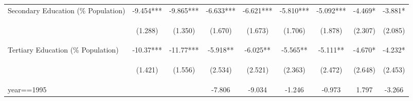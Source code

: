 \begin{landscape}
\begin{table}[htpb!]
\begin{center}
\begin{tabular}{lcccccccc}
Secondary Education (\% Population)	&	-9.454***	&	-9.865***	&	-6.633***	&	-6.621***	&	-5.810***	&	-5.092***	&	-4.469*	&	-3.881*	\\	
	& \begin{footnotesize}	(1.288)	\end{footnotesize} & \begin{footnotesize}	(1.350)	\end{footnotesize} & \begin{footnotesize}	(1.670)	\end{footnotesize} & \begin{footnotesize}	(1.673)	\end{footnotesize} & \begin{footnotesize}	(1.706)	\end{footnotesize} & \begin{footnotesize}	(1.878)	\end{footnotesize} & \begin{footnotesize}	(2.307)	\end{footnotesize} & \begin{footnotesize}	(2.085)	\end{footnotesize} \\	
Tertiary Education (\% Population)	&	-10.37***	&	-11.77***	&	-5.918**	&	-6.025**	&	-5.565**	&	-5.111**	&	-4.670*	&	-4.232*	\\	
	& \begin{footnotesize}	(1.421)	\end{footnotesize} & \begin{footnotesize}	(1.556)	\end{footnotesize} & \begin{footnotesize}	(2.534)	\end{footnotesize} & \begin{footnotesize}	(2.521)	\end{footnotesize} & \begin{footnotesize}	(2.363)	\end{footnotesize} & \begin{footnotesize}	(2.472)	\end{footnotesize} & \begin{footnotesize}	(2.648)	\end{footnotesize} & \begin{footnotesize}	(2.453)	\end{footnotesize} \\	
year==1995	&		&		&	-7.806	&	-9.034	&	-1.246	&	-0.973	&	1.797	&	-3.266	\\	

\end{tabular}
\end{center}
\end{table}
\end{landscape}
